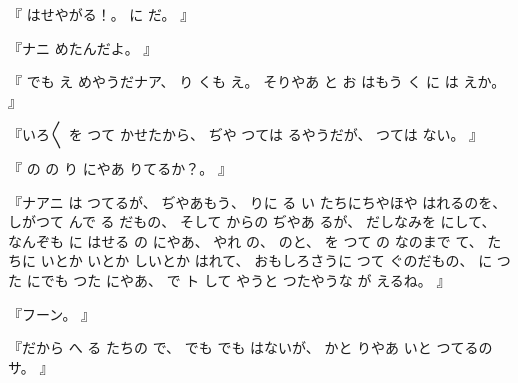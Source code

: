 %
『
はせやがる！。
%
に
だ。
』

%
『ナニ
めたんだよ。
』

%
『
でも
え
めやうだナア、
%
り
くも
え。
%
そりやあ
と
お
はもう
く
に
は
えか。
』

%
『いろ〳〵
を
つて
かせたから、
%
ぢや
つては
るやうだが、
%
つては
ない。
』

%
『
の
の
り
にやあ
りてるか？。
』

%
『ナアニ
は
つてるが、
%
ぢやあもう、
%
りに
る
い
たちにちやほや
はれるのを、
%
しがつて
んで
る
だもの、
%
そして
からの
ぢやあ
るが、
%
だしなみを
にして、
%
なんぞも
に
はせる
の
にやあ、
%
やれ
の、
%
のと、
%
を
つて
の
なのまで
て、
%
たちに
いとか
いとか
しいとか
はれて、
%
おもしろさうに
つて
ぐのだもの、
%
に
つた
にでも
つた
にやあ、
%
で
ト
して
やうと
つたやうな
が
えるね。
』

%
『フーン。
』

%
『だから
へ
る
たちの
で、
%
でも
でも
はないが、
%
かと
りやあ
いと
つてるのサ。
』

